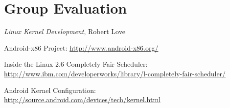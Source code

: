 \documentclass[12pt,letterpaper]{article}
\begin{document}
\section{Group Evaluation}



\begin{thebibliography}{9}

  \textit{Linux Kernel Development},
  Robert Love

  Android-x86 Project:
  \url{http://www.android-x86.org/}

  Inside the Linux 2.6 Completely Fair Scheduler:
  \url{http://www.ibm.com/developerworks/library/l-completely-fair-scheduler/}

  Android Kernel Configuration:
  \url{http://source.android.com/devices/tech/kernel.html}

\end{thebibliography}
\end{document}
